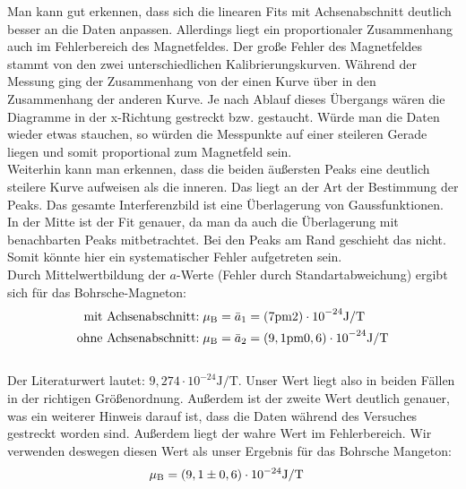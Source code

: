 Man kann gut erkennen, dass sich die linearen Fits mit Achsenabschnitt deutlich besser an die Daten anpassen. Allerdings liegt ein proportionaler Zusammenhang auch im Fehlerbereich des Magnetfeldes. Der große Fehler des Magnetfeldes stammt von den zwei unterschiedlichen Kalibrierungskurven. Während der Messung ging der Zusammenhang von der einen Kurve über in den Zusammenhang der anderen Kurve. Je nach Ablauf dieses Übergangs wären die Diagramme in der x-Richtung gestreckt bzw. gestaucht. Würde man die Daten wieder etwas stauchen, so würden die Messpunkte auf einer steileren Gerade liegen und somit proportional zum Magnetfeld sein.\\
Weiterhin kann man erkennen, dass die beiden äußersten Peaks eine deutlich steilere Kurve aufweisen als die inneren. Das liegt an der Art der Bestimmung der Peaks. Das gesamte Interferenzbild ist eine Überlagerung von Gaussfunktionen. In der Mitte ist der Fit genauer, da man da auch die Überlagerung mit benachbarten Peaks mitbetrachtet. Bei den Peaks am Rand geschieht das nicht. Somit könnte hier ein systematischer Fehler aufgetreten sein.\\
 
Durch Mittelwertbildung der $a$-Werte (Fehler durch Standartabweichung) ergibt sich für das Bohrsche-Magneton:\\
\begin{align*}
\text{mit Achsenabschnitt:}\;& \mu\ind{B} = \bar{a}_1 = \si{(7 \pm 2) \cdot 10^{-24} \joule/\tesla}\\
\text{ohne Achsenabschnitt:}\;& \mu\ind{B} = \bar{a}_2 = \si{(9,1 \pm 0,6) \cdot 10^{-24} \joule/\tesla}\\
\end{align*}\\
Der Literaturwert lautet: $9,274 \cdot 10^{-24} \si{\joule/\tesla}$\cite{wiki_konst}. Unser Wert liegt also in beiden Fällen in der richtigen Größenordnung. Außerdem ist der zweite Wert deutlich genauer, was ein weiterer Hinweis darauf ist, dass die Daten während des Versuches gestreckt worden sind. Außerdem liegt der wahre Wert im Fehlerbereich. Wir verwenden deswegen diesen Wert als unser Ergebnis für das Bohrsche Mangeton:
\begin{align*}
\mu\ind{B} &= (9,1 \pm 0,6) \cdot 10^{-24} \si{\joule/\tesla}
\end{align*}
